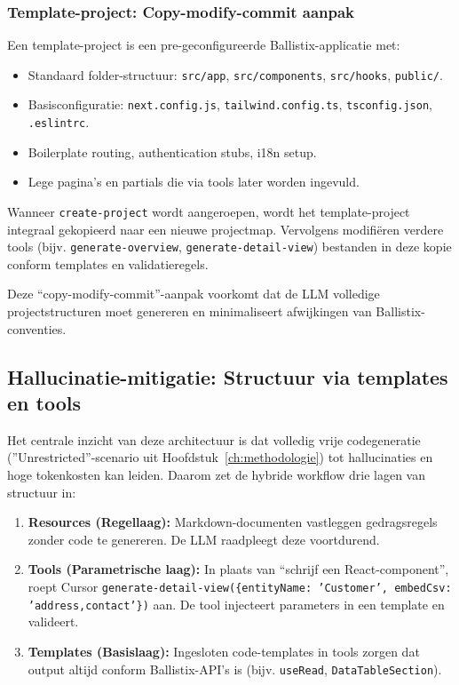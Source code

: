 \subsubsection{Template-project: Copy-modify-commit aanpak}

Een template-project is een pre-geconfigureerde Ballistix-applicatie met:

\begin{itemize}
  \item Standaard folder-structuur: \texttt{src/app}, \texttt{src/components}, \texttt{src/hooks}, \texttt{public/}.
  \item Basisconfiguratie: \texttt{next.config.js}, \texttt{tailwind.config.ts}, \texttt{tsconfig.json}, \texttt{.eslintrc}.
  \item Boilerplate routing, authentication stubs, i18n setup.
  \item Lege pagina's en partials die via tools later worden ingevuld.
\end{itemize}

Wanneer \texttt{create-project} wordt aangeroepen, wordt het template-project integraal gekopieerd naar een nieuwe projectmap. Vervolgens modifiëren verdere tools (bijv. \texttt{generate-overview}, \texttt{generate-detail-view}) bestanden in deze kopie conform templates en validatieregels.

Deze ``copy-modify-commit''-aanpak voorkomt dat de LLM volledige projectstructuren moet genereren en minimaliseert afwijkingen van Ballistix-conventies.

\subsection{Hallucinatie-mitigatie: Structuur via templates en tools}

Het centrale inzicht van deze architectuur is dat volledig vrije codegeneratie (''Unrestricted''-scenario uit Hoofdstuk~\ref{ch:methodologie}) tot hallucinaties en hoge tokenkosten kan leiden. Daarom zet de hybride workflow drie lagen van structuur in:

\begin{enumerate}
  \item \textbf{Resources (Regellaag):} Markdown-documenten vastleggen gedragsregels zonder code te genereren. De LLM raadpleegt deze voortdurend.
  \item \textbf{Tools (Parametrische laag):} In plaats van ``schrijf een React-component'', roept Cursor \texttt{generate-detail-view(\{entityName: 'Customer', embedCsv: 'address,contact'\})} aan. De tool injecteert parameters in een template en valideert.
  \item \textbf{Templates (Basislaag):} Ingesloten code-templates in tools zorgen dat output altijd conform Ballistix-API's is (bijv. \texttt{useRead}, \texttt{DataTableSection}).
\end{enumerate}

